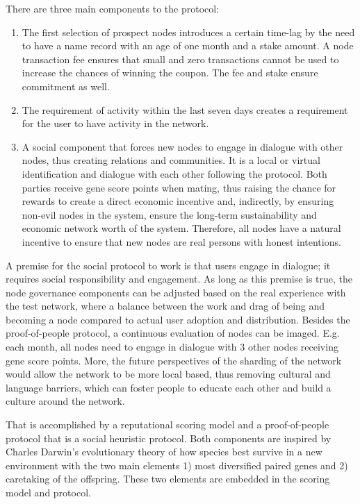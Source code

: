 There are three main components to the protocol:
\begin{enumerate}
 \item The first selection of prospect nodes introduces a certain time-lag by the need to have a name record with an age of one month and a stake amount. A node transaction fee ensures that small and zero transactions cannot be used to increase the chances of winning the coupon. The fee and stake ensure commitment as well.  
 \item The requirement of activity within the last seven days creates a requirement for the user to have activity in the network. 
 \item A social component that forces new nodes to engage in dialogue with other nodes, thus creating relations and communities. It is a local or virtual identification and dialogue with each other following the protocol. Both parties receive gene score points when mating, thus raising the chance for rewards to create a direct economic incentive and, indirectly, by ensuring non-evil nodes in the system, ensure the long-term sustainability and economic network worth of the system. Therefore, all nodes have a natural incentive to ensure that new nodes are real persons with honest intentions.
\end{enumerate}

A premise for the social protocol to work is that users engage in dialogue; it requires social responsibility and engagement. As long as this premise is true, the node governance components can be adjusted based on the real experience with the test network, where a balance between the work and drag of being and becoming a node compared to actual user adoption and distribution. \newline
Besides the proof-of-people protocol, a continuous evaluation of nodes can be imaged. E.g. each month, all nodes need to engage in dialogue with 3 other nodes receiving gene score points. 
More, the future perspectives of the sharding of the network would allow the network to be more local based, thus removing cultural and language barriers, which can foster people to educate each other and build a culture around the network. 

That is accomplished by a reputational scoring model and a proof-of-people protocol that is a social heuristic protocol. Both components are inspired by Charles Darwin's evolutionary theory of how species best survive in a new environment with the two main elements 1) most diversified paired genes and 2) caretaking of the offspring. These two elements are embedded in the scoring model and protocol. 

